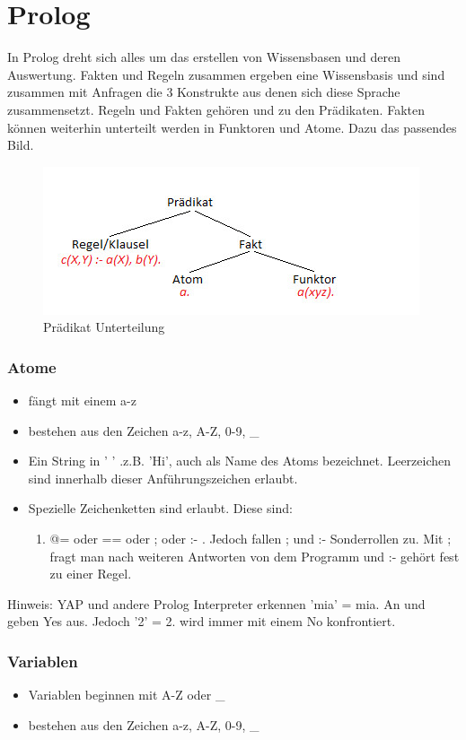 \chapter{Prolog}
\label{sec:Prolog}
In Prolog dreht sich alles um das erstellen von Wissensbasen und deren Auswertung. Fakten und Regeln zusammen ergeben eine Wissensbasis und sind zusammen mit Anfragen die 3 Konstrukte aus denen sich diese Sprache zusammensetzt. Regeln und Fakten gehören und zu den Prädikaten. Fakten können weiterhin unterteilt werden in Funktoren und Atome. Dazu das passendes Bild. 

\begin{figure}[h]
\centering
\includegraphics[width=0.5\linewidth]{mainmatter/pics/Prolog}
\caption[Prädikat Unterteilung]{Prädikat Unterteilung}
\label{fig:Prolog}
\end{figure}

\subsection{Atome}
\begin{itemize}
	\item fängt mit einem a-z
	\item bestehen aus den Zeichen a-z, A-Z, 0-9, \_
	\item Ein String in ' ' .z.B. 'Hi', auch als Name des Atoms bezeichnet. Leerzeichen sind innerhalb dieser Anführungszeichen erlaubt.
	\item Spezielle Zeichenketten sind erlaubt. Diese sind:
	\begin{enumerate}
		\item @= oder == oder ; oder :-  . Jedoch fallen ; und :- Sonderrollen zu. Mit ; fragt man nach weiteren Antworten von dem Programm und :- gehört fest zu einer Regel.
	\end{enumerate}
\end{itemize}
Hinweis: YAP und andere Prolog Interpreter erkennen 'mia' = mia. An und geben Yes aus. Jedoch '2' = 2. wird immer mit einem No konfrontiert. 
\subsection{Variablen}
\begin{itemize}
	\item Variablen beginnen mit A-Z oder \_ 
	\item bestehen aus den Zeichen a-z, A-Z, 0-9, \_
\end{itemize}\newpage
